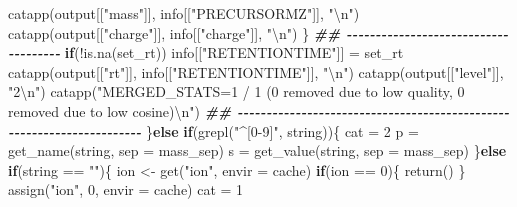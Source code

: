 \documentclass[
]{article}
\newenvironment{Shaded}{\begin{snugshade}}{\end{snugshade}}
\newcommand{\AttributeTok}[1]{\textcolor[rgb]{0.77,0.63,0.00}{#1}}
\newcommand{\ControlFlowTok}[1]{\textcolor[rgb]{0.13,0.29,0.53}{\textbf{#1}}}
\newcommand{\DecValTok}[1]{\textcolor[rgb]{0.00,0.00,0.81}{#1}}
\newcommand{\DocumentationTok}[1]{\textcolor[rgb]{0.56,0.35,0.01}{\textbf{\textit{#1}}}}
\newcommand{\FunctionTok}[1]{\textcolor[rgb]{0.00,0.00,0.00}{#1}}
\newcommand{\NormalTok}[1]{#1}
\newcommand{\OtherTok}[1]{\textcolor[rgb]{0.56,0.35,0.01}{#1}}
\newcommand{\SpecialCharTok}[1]{\textcolor[rgb]{0.00,0.00,0.00}{#1}}
\newcommand{\StringTok}[1]{\textcolor[rgb]{0.31,0.60,0.02}{#1}}
\begin{document}
\begin{Shaded}
\begin{Highlighting}[]
        \FunctionTok{catapp}\NormalTok{(output[[}\StringTok{"mass"}\NormalTok{]], info[[}\StringTok{"PRECURSORMZ"}\NormalTok{]], }\StringTok{"}\SpecialCharTok{\textbackslash{}n}\StringTok{"}\NormalTok{)}
        \FunctionTok{catapp}\NormalTok{(output[[}\StringTok{"charge"}\NormalTok{]], info[[}\StringTok{"charge"}\NormalTok{]], }\StringTok{"}\SpecialCharTok{\textbackslash{}n}\StringTok{"}\NormalTok{)}
\NormalTok{      \}}
      \DocumentationTok{\#\# {-}{-}{-}{-}{-}{-}{-}{-}{-}{-}{-}{-}{-}{-}{-}{-}{-}{-}{-}{-}{-}{-}{-}{-}{-}{-}{-}{-}{-}{-}{-}{-}{-}{-}{-}{-}{-} }
      \ControlFlowTok{if}\NormalTok{(}\SpecialCharTok{!}\FunctionTok{is.na}\NormalTok{(set\_rt))}
\NormalTok{        info[[}\StringTok{"RETENTIONTIME"}\NormalTok{]] }\OtherTok{=}\NormalTok{ set\_rt}
      \FunctionTok{catapp}\NormalTok{(output[[}\StringTok{"rt"}\NormalTok{]], info[[}\StringTok{"RETENTIONTIME"}\NormalTok{]], }\StringTok{"}\SpecialCharTok{\textbackslash{}n}\StringTok{"}\NormalTok{)}
      \FunctionTok{catapp}\NormalTok{(output[[}\StringTok{"level"}\NormalTok{]], }\StringTok{"2}\SpecialCharTok{\textbackslash{}n}\StringTok{"}\NormalTok{)}
      \FunctionTok{catapp}\NormalTok{(}\StringTok{"MERGED\_STATS=1 / 1 (0 removed due to low quality, 0 removed due to low cosine)}\SpecialCharTok{\textbackslash{}n}\StringTok{"}\NormalTok{)}
      \DocumentationTok{\#\# {-}{-}{-}{-}{-}{-}{-}{-}{-}{-}{-}{-}{-}{-}{-}{-}{-}{-}{-}{-}{-}{-}{-}{-}{-}{-}{-}{-}{-}{-}{-}{-}{-}{-}{-}{-}{-}{-}{-}{-}{-}{-}{-}{-}{-}{-}{-}{-}{-}{-}{-}{-}{-}{-}{-}{-}{-}{-}{-}{-}{-}{-}{-}{-}{-}{-}{-}{-}{-}{-} }
\NormalTok{    \}}\ControlFlowTok{else} \ControlFlowTok{if}\NormalTok{(}\FunctionTok{grepl}\NormalTok{(}\StringTok{"\^{}[0{-}9]"}\NormalTok{, string))\{}
\NormalTok{      cat }\OtherTok{=} \DecValTok{2}
\NormalTok{      p }\OtherTok{=} \FunctionTok{get\_name}\NormalTok{(string, }\AttributeTok{sep =}\NormalTok{ mass\_sep)}
\NormalTok{      s }\OtherTok{=} \FunctionTok{get\_value}\NormalTok{(string, }\AttributeTok{sep =}\NormalTok{ mass\_sep)}
\NormalTok{    \}}\ControlFlowTok{else} \ControlFlowTok{if}\NormalTok{(string }\SpecialCharTok{==} \StringTok{""}\NormalTok{)\{}
\NormalTok{      ion }\OtherTok{\textless{}{-}} \FunctionTok{get}\NormalTok{(}\StringTok{"ion"}\NormalTok{, }\AttributeTok{envir =}\NormalTok{ cache)}
      \ControlFlowTok{if}\NormalTok{(ion }\SpecialCharTok{==} \DecValTok{0}\NormalTok{)\{}
        \FunctionTok{return}\NormalTok{()}
\NormalTok{      \}}
      \FunctionTok{assign}\NormalTok{(}\StringTok{"ion"}\NormalTok{, }\DecValTok{0}\NormalTok{, }\AttributeTok{envir =}\NormalTok{ cache)}
\NormalTok{      cat }\OtherTok{=} \DecValTok{1}

\end{Highlighting}
\end{Shaded}
\end{document}
